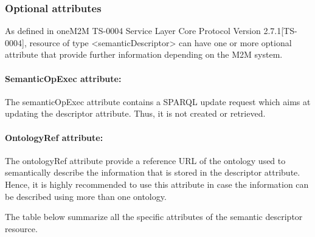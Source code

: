 \subsubsection{Optional attributes}
As defined in oneM2M TS-0004 Service Layer Core Protocol Version 2.7.1[TS-0004], resource of type <semanticDescriptor> can have one or more optional attribute that provide further information depending on the M2M system.
\paragraph*{SemanticOpExec attribute:}
The semanticOpExec attribute contains a SPARQL update request which aims at updating the descriptor attribute. Thus, it is not created or retrieved. 
\paragraph*{OntologyRef attribute:}
 The ontologyRef attribute provide a reference URL of the ontology used to semantically describe the information that is stored in the descriptor attribute. Hence, it is highly recommended to use this attribute in case the information can be described using more than one ontology.\par
The table below summarize all the specific attributes of the semantic descriptor resource.

